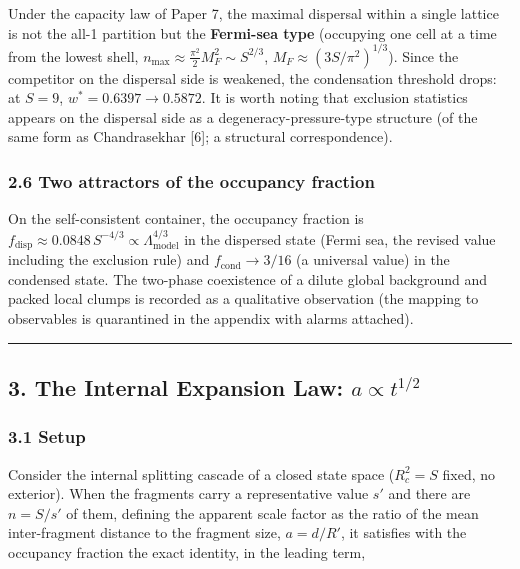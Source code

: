 \documentclass[
]{ltjsarticle}
\begin{document}
Under the capacity law of Paper 7, the maximal dispersal within a single
lattice is not the all-1 partition but the \textbf{Fermi-sea type}
(occupying one cell at a time from the lowest shell,
\(n_{\max}\approx\tfrac{\pi^2}2 M_F^2\sim S^{2/3}\),
\(M_F\approx(3S/\pi^2)^{1/3}\)). Since the competitor on the dispersal
side is weakened, the condensation threshold drops: at \(S=9\),
\(w^*=0.6397\to0.5872\). It is worth noting that exclusion statistics
appears on the dispersal side as a degeneracy-pressure-type structure
(of the same form as Chandrasekhar {[}6{]}; a structural
correspondence).

\subsubsection{2.6 Two attractors of the occupancy
fraction}\label{two-attractors-of-the-occupancy-fraction}

On the self-consistent container, the occupancy fraction is
\(f_{\mathrm{disp}}\approx0.0848\,S^{-4/3}\propto\Lambda_{\mathrm{model}}^{4/3}\)
in the dispersed state (Fermi sea, the revised value including the
exclusion rule) and \(f_{\mathrm{cond}}\to3/16\) (a universal value) in
the condensed state. The two-phase coexistence of a dilute global
background and packed local clumps is recorded as a qualitative
observation (the mapping to observables is quarantined in the appendix
with alarms attached).

\begin{center}\rule{0.5\linewidth}{0.5pt}\end{center}

\subsection{\texorpdfstring{3. The Internal Expansion Law:
\(a\propto t^{1/2}\)}{3. The Internal Expansion Law: a\textbackslash propto t\^{}\{1/2\}}}\label{the-internal-expansion-law-apropto-t12}

\subsubsection{3.1 Setup}\label{setup}

Consider the internal splitting cascade of a closed state space
(\(R_c^2=S\) fixed, no exterior). When the fragments carry a
representative value \(s'\) and there are \(n=S/s'\) of them, defining
the apparent scale factor as the ratio of the mean inter-fragment
distance to the fragment size, \(a=d/R'\), it satisfies with the
occupancy fraction the exact identity, in the leading term,
\end{document}
